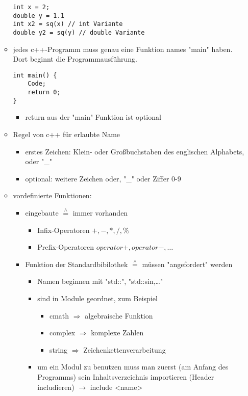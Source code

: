 \documentclass[a4paper]{scrartcl}
\newcommand{\estimates}{\overset{\scriptscriptstyle\wedge}{=}}%
\begin{document}
\begin{itemize}
\begin{itemize}
\begin{verbatim}
int x = 2;
double y = 1.1
int x2 = sq(x) // int Variante
double y2 = sq(y) // double Variante
\end{verbatim}
\item jedes c++-Programm muss genau eine Funktion names "main" haben. Dort beginnt die Programmausführung.
\begin{verbatim}
int main() {
	Code;
	return 0;
}
\end{verbatim}
\begin{itemize}
\item return aus der "main" Funktion ist optional
\end{itemize}
\item Regel von c++ für erlaubte Name
\begin{itemize}
\item erstes Zeichen: Klein- oder Großbuchstaben des englischen Alphabets, oder "\_"
\item optional: weitere Zeichen oder, "\_" oder Ziffer 0-9
\end{itemize}
\item vordefinierte Funktionen:
\begin{itemize}
\item eingebaute $\estimates$ immer vorhanden
\begin{itemize}
\item Infix-Operatoren $+,-,*,/,\%$
\item Prefix-Operatoren $operator+,operator-,\ldots$
\end{itemize}
\item Funktion der Standardbibilothek $\estimates$ müssen "angefordert" werden
\begin{itemize}
\item Namen beginnen mit "std::", "std::sin,\ldots{}"
\item sind in Module geordnet, zum Beispiel
\begin{itemize}
\item cmath $\Rightarrow$ algebraische Funktion
\item complex $\Rightarrow$ komplexe Zahlen
\item string $\Rightarrow$ Zeichenkettenverarbeitung
\end{itemize}
\item um ein Modul zu benutzen muss man zuerst (am Anfang des Programms) sein Inhaltsverzeichnis importieren (Header includieren) $\rightarrow$ include <name>
\begin{verbatim}

\end{verbatim}
\end{itemize}
\end{itemize}
\end{itemize}
\end{itemize}
\end{document}
